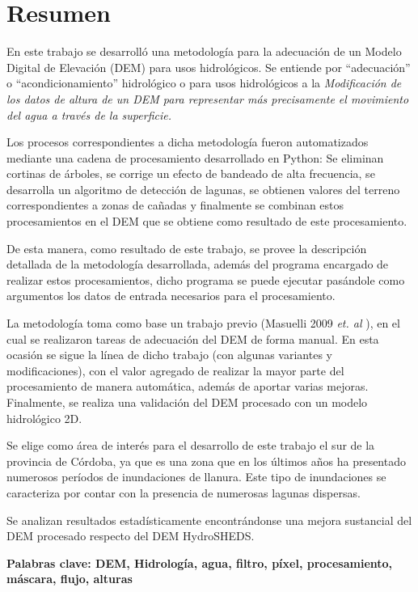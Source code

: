 \chapter*{Resumen}
\label{chap:resumen}


En este trabajo se desarrolló una metodología para la adecuación de un Modelo Digital de Elevación (DEM) para usos hidrológicos. Se entiende por "`adecuación"' o "`acondicionamiento"' hidrológico o para usos hidrológicos a la \textit{Modificación de los datos de altura de un DEM para representar más precisamente el movimiento del agua a través de la superficie.}

Los procesos correspondientes a dicha metodología fueron automatizados mediante una cadena de procesamiento desarrollado en Python: Se eliminan cortinas de árboles, se corrige un efecto de bandeado de alta frecuencia, se desarrolla un algoritmo de detección de lagunas, se obtienen valores del terreno correspondientes a zonas de cañadas y finalmente se combinan estos procesamientos en el DEM que se obtiene como resultado de este procesamiento.

De esta manera, como resultado de este trabajo, se provee la descripción detallada de la metodología desarrollada, además del programa encargado de realizar estos procesamientos, dicho programa se puede ejecutar pasándole como argumentos los datos de entrada necesarios para el procesamiento.

La metodología toma como base un trabajo previo (Masuelli 2009 \textit{et. al} \cite{Masuelli2009}), en el cual se realizaron tareas de adecuación del DEM de forma manual. En esta ocasión se sigue la línea de dicho trabajo (con algunas variantes y modificaciones), con el valor agregado de realizar la mayor parte del procesamiento de manera automática, además de aportar varias mejoras. Finalmente, se realiza una validación del DEM procesado con un modelo hidrológico 2D.

Se elige como área de interés para el desarrollo de este trabajo el sur de la provincia de Córdoba, ya que es una zona que en los últimos años ha presentado numerosos períodos de inundaciones de llanura. Este tipo de inundaciones se caracteriza por contar con la presencia de numerosas lagunas dispersas.

Se analizan resultados estadísticamente encontrándonse una mejora sustancial del DEM procesado respecto del DEM HydroSHEDS.


\textbf{Palabras clave: DEM, Hidrología, agua, filtro, píxel, procesamiento, máscara, flujo, alturas}